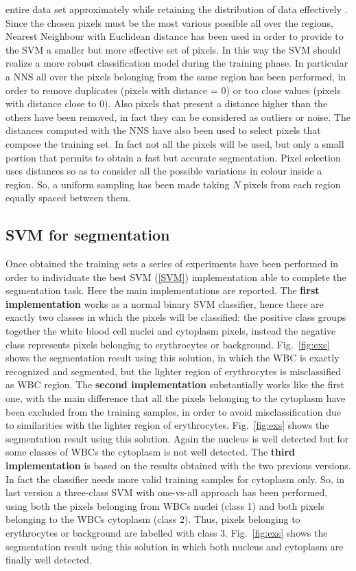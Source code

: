 \documentclass[final,a4paper,12pt,english]{UnicaPhdThesis3}
\begin{document}
entire data set approximately while retaining the distribution of data effectively \cite{caflisch}. Since the chosen pixels must be the most various possible all over the regions, Nearest Neighbour with Euclidean distance has been used in order to provide to the SVM a smaller but more effective set of pixels. In this way the SVM should realize a more robust classification model during the training phase. In particular a NNS all over the pixels belonging from the same region has been performed, in order to remove duplicates (pixels with distance = 0) or too close values (pixels with distance close to 0). Also pixels that present a distance higher than the others have been removed, in fact they can be considered as outliers or noise. The distances computed with the NNS have also been used to select pixels that compose the training set. In fact not all the pixels will be used, but only a small portion that permits to obtain a fast but accurate segmentation. Pixel selection uses distances so as to consider all the possible variations in colour inside a region. So, a uniform sampling has been made taking $N$ pixels from each region equally spaced between them. 
	
	\subsection{SVM for segmentation}
	Once obtained the training sets a series of experiments have been performed in order to individuate the best SVM (\ref{SVM}) implementation able to complete the segmentation task. Here the main implementations are reported. The \textbf{first implementation} works as a normal binary SVM classifier, hence there are exactly two classes in which the pixels will be classified: the positive class groups together the white blood cell nuclei and cytoplasm pixels, instead the negative class represents pixels belonging to erythrocytes or background. Fig.~\ref{fig:exs} shows the segmentation result using this solution, in which the WBC is exactly recognized and segmented, but the lighter region of erythrocytes is misclassified as WBC region. The \textbf{second implementation} substantially works like the first one, with the main difference that all the pixels belonging to the cytoplasm have been excluded from the training samples, in order to avoid misclassification due to similarities with the lighter region of erythrocytes. Fig.~\ref{fig:exs} shows the segmentation result using this solution. Again the nucleus is well detected but for some classes of WBCs the cytoplasm is not well detected. The \textbf{third implementation} is based on the results obtained with the two previous versions. In fact the classifier needs more valid training samples for cytoplasm only. So, in last version a three-class SVM with one-vs-all approach has been performed, using both the pixels belonging from WBCs nuclei (class 1) and both pixels belonging to the WBCs cytoplasm (class 2). Thus, pixels belonging to erythrocytes or background are labelled with class 3. Fig.~\ref{fig:exs} shows the segmentation result using this solution in which both nucleus and cytoplasm are finally well detected.
	
\end{document}
